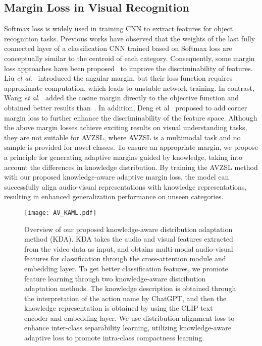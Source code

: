 \documentclass[10pt,twocolumn,letterpaper]{article}
\begin{document}
\subsection{Margin Loss in Visual Recognition}
Softmax loss is widely used in training CNN to extract features for object recognition tasks. 
Previous works have observed that the weights of the last fully connected layer of a classification CNN trained based on Softmax loss are conceptually similar to the centroid of each category. 
Consequently, some margin loss approaches have been proposed~\cite{Arcface,SphereFace,CosFace} to improve the discriminability of features. 
Liu \textit{et al}.~\cite{SphereFace} introduced the angular margin, but their loss function requires approximate computation, which leads to unstable network training. 
In contrast, Wang \textit{et al}.~\cite{CosFace} added the cosine margin directly to the objective function and obtained better results than~\cite{SphereFace}. In addition, Deng et al~\cite{Arcface} proposed to add corner margin loss to further enhance the discriminability of the feature space.
Although the above margin losses achieve exciting results on visual understanding tasks, they are not suitable for AVZSL, where AVZSL is a multimodal task and no sample is provided for novel classes.
To ensure an appropriate margin, we propose a principle for generating adaptive margins guided by knowledge, taking into account the differences in knowledge distribution.
By training the AVZSL method with our proposed knowledge-aware adaptive margin loss, the model can successfully align audio-visual representations with knowledge representations, resulting in enhanced generalization performance on unseen categories.

\begin{figure*}[t]
	\centering	\texttt{[image: AV\_KAML.pdf]}
	\caption{Overview of our proposed knowledge-aware distribution adaptation method (KDA). KDA takes the audio and visual features extracted from the video data as input, and obtains multi-modal audio-visual features  for classification through the cross-attention module and embedding layer. To get better classification features, we promote feature learning through two knowledge-aware distribution adaptation methods. The knowledge description is obtained through the interpretation of the action name by ChatGPT, and then the knowledge representation  is obtained by using the CLIP text encoder and embedding layer. We use distribution alignment loss  to enhance inter-class separability learning, utilizing knowledge-aware adaptive loss  to promote intra-class compactness learning.
}
	\label{KAML}
\end{figure*}
\end{document}
